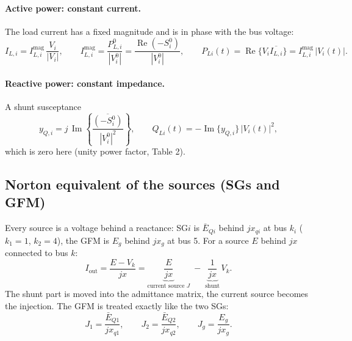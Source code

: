\documentclass[11pt,a4paper]{article}
\numberwithin{equation}{section}
\newcommand{\cj}[1]{\overline{#1}}
\newcommand{\re}{\operatorname{Re}}
\newcommand{\im}{\operatorname{Im}}
\begin{document}
\paragraph{Active power: constant current.} The load current has a fixed magnitude and is in phase with the bus voltage:
\begin{equation}
I_{L,i} = I_{L,i}^{\text{mag}}\,\frac{V_i}{|V_i|},\qquad
I_{L,i}^{\text{mag}} = \frac{P_{L,i}^0}{|V_i^0|} = \frac{\re(-S_i^0)}{|V_i^0|},\qquad
P_{Li}(t) = \re\{V_i\cj{I_{L,i}}\} = I_{L,i}^{\text{mag}}\,|V_i(t)| .
\end{equation}
\paragraph{Reactive power: constant impedance.} A shunt susceptance
\begin{equation}
y_{Q,i} = j\,\im\!\left\{\frac{\cj{(-S_i^0)}}{|V_i^0|^2}\right\},\qquad Q_{Li}(t) = -\im\{y_{Q,i}\}\,|V_i(t)|^2,
\end{equation}
which is zero here (unity power factor, Table 2).

\subsection{Norton equivalent of the sources (SGs and GFM)}
Every source is a voltage behind a reactance: SG$i$ is $\bar E_{Qi}$ behind $jx_{qi}$ at bus $k_i$ ($k_1=1$, $k_2=4$), the GFM is $E_g$ behind $jx_g$ at bus 5. For a source $E$ behind $jx$ connected to bus $k$:
\begin{equation}
I_{\text{out}} = \frac{E - V_k}{jx} = \underbrace{\frac{E}{jx}}_{\text{current source } J}\; - \;\underbrace{\frac{1}{jx}}_{\text{shunt}}\,V_k .
\end{equation}
The shunt part is moved into the admittance matrix, the current source becomes the injection. The GFM is treated exactly like the two SGs:
\begin{equation}
J_1 = \frac{\bar E_{Q1}}{jx_{q1}},\qquad J_2 = \frac{\bar E_{Q2}}{jx_{q2}},\qquad J_g = \frac{E_g}{jx_g}.
\end{equation}
\end{document}
